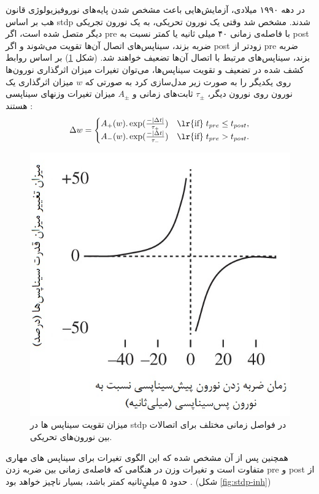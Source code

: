 \documentclass[12pt]{report}
\begin{document}
	
	در دهه ۱۹۹۰ میلادی، آزمایش‌هایی باعث مشخص شدن پایه‌های نوروفیزیولوژی قانون هب بر اساس \gls{stdp} شدند.
	\cite{caporale2008spike} 
	مشخص شد وقتی یک نورون تحریکی، به یک نورون تجریکی دیگر متصل شده است، اگر \gls{pre} با فاصله‌ی زمانی ۴۰ میلی ثانیه یا کمتر نسبت به \gls{post} ضربه بزند، سیناپس‌های اتصال آن‌ها تقویت می‌شوند و اگر \gls{post} زودتر از \gls{pre} ضربه بزند، سیناپس‌های مرتبط با اتصال آن‌ها تضعیف خواهند شد. (شکل \ref{fig:stdp})
	بر اساس روابط کشف شده در تضعیف و تقویت سیناپس‌ها، می‌توان تغیرات میزان اثرگذاری نورون‌ها روی یکدیگر را به صورت زیر مدل‌سازی کرد به صورتی که $w$ میزان اثرگذاری یک نورون روی نورون دیگر، $\tau_\pm$ ثابت‌های زمانی  و $A_\pm$ میزان تغیرات وزنهای سیناپسی هستند
	\cite{gerstner2014neuronal}:
	\begin{align}
		\Delta w =
		\begin{cases}
			A_+(w).\exp(\frac{-|\Delta t|}{\tau_+})  & \text{\lr{if}}\; t_{pre} \leq t_{post}, \\
			A_-(w).\exp(\frac{-|\Delta t|}{\tau_-})  & \text{\lr{if}}\; t_{pre} > t_{post}.
		\end{cases}
		\label{eq:stdp}
	\end{align}
	
	
	\begin{figure}[H]
		\centering
		\includegraphics[width=0.7\linewidth]{stdp.jpg}
		\caption[NS]{
			میزان تقویت سیناپس ها در \gls{stdp} در فواصل زمانی مختلف برای اتصالات بین نورون‌های تحریکی.
		}
		\label{fig:stdp}
	\end{figure}

	همچنین پس از آن مشخص شده که این الگوی تغیرات برای سیناپس های مهاری متفاوت است و تغیرات وزن در هنگامی که فاصله‌ی زمانی بین ضربه زدن \gls{pre} و \gls{post} از حدود ۵ میلیٍ‌ثانیه کمتر باشد، بسیار ناچیز خواهد بود \cite{Haas2006}. (شکل \ref{fig:stdp-inh})
	
\end{document}
